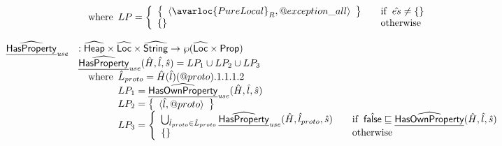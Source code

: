 \[\begin{array}{ll}
& \quad\wherec{
  LP =
  \left\{
    \begin{array}{ll}
      \set{\langle \avarloc{PureLocal}_R, \varprop{exception\_all} \rangle} & \quad\ifc{\hat{es}\not=\set{}} \\
      \set{} & \quad\owc\\
    \end{array}
  \right.
}
\\\\
\ahf{HasProperty}_{\it use} & : \aHeap \times \aLoc \times \abs{String} \rightarrow \powerset{\aLoc \times \SF{Prop}}\\
& \ahf{HasProperty}_{\it use}(\hat{H},\hat{l},\hat{s}) = LP_1 \cup LP_2 \cup LP_3\\
& \quad\wherec{
  \hat{L}_{proto} = \hat{H}(\hat{l})(\varprop{proto}).1.1.1.2 \\
  LP_1 = \ahf{HasOwnProperty}_{\it use}(\hat{H},\hat{l},\hat{s}) \\
  LP_2 = \set{\langle \hat{l}, \varprop{proto} \rangle} \\
  LP_3 = \left\{
    \begin{array}{ll}
      \bigcup_{\hat{l}_{proto}\in\hat{L}_{proto}}\ahf{HasProperty}_{\it use}(\hat{H},\hat{l}_{proto},\hat{s})
      & \quad\ifc{\afalse \sqsubseteq \ahf{HasOwnProperty}(\hat{H},\hat{l},\hat{s})}\\
      \set{} &\quad\owc
    \end{array}
  \right.
}
\\\\

\end{array}
\]
\newpage
